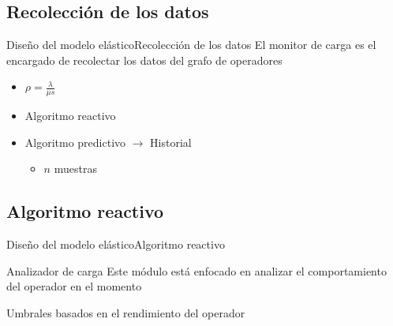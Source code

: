 \subsection*{Recolección de los datos}
\begin{frame}{Diseño del modelo elástico}{Recolección de los datos}
El monitor de carga es el encargado de recolectar los datos del grafo de operadores
\begin{itemize}
	\item $\rho = \frac{\lambda}{\mu s}$
	\item Algoritmo reactivo
	\item Algoritmo predictivo $\rightarrow$ Historial
	\begin{itemize}
		\item $n$ muestras
	\end{itemize}
\end{itemize}

\end{frame}

\subsection*{Algoritmo reactivo}
\begin{frame}{Diseño del modelo elástico}{Algoritmo reactivo}
\begin{block}{Analizador de carga}
	Este módulo está enfocado en analizar el comportamiento del operador en el momento
\end{block}

\pause
\begin{alertblock}{}
	\centering
	Umbrales basados en el rendimiento del operador
\end{alertblock}
\end{frame}

